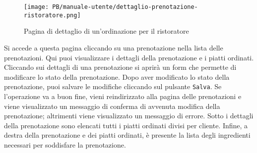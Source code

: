 \begin{figure}[htbp]
    \centering
	\texttt{[image: PB/manuale-utente/dettaglio-prenotazione-ristoratore.png]}
    \caption{Pagina di dettaglio di un'ordinazione per il ristoratore}
\end{figure}

Si accede a questa pagina cliccando su una prenotazione nella lista delle
prenotazioni. Qui puoi visualizzare i dettagli della prenotazione e i piatti
ordinati. Cliccando sui dettagli di una prenotazione si aprirà un form che
permette di modificare lo stato della prenotazione. Dopo aver modificato lo
stato della prenotazione, puoi salvare le modifiche cliccando sul pulsante
\texttt{Salva}. Se l'operazione va a buon fine, vieni reindirizzato alla pagina
delle prenotazioni e viene visualizzato un messaggio di conferma di avvenuta
modifica della prenotazione; altrimenti viene visualizzato un messaggio di errore.
Sotto i dettagli della prenotazione sono elencati tutti i piatti ordinati divisi
per cliente. Infine, a destra della prenotazione e dei piatti ordinati, è
presente la lista degli ingredienti necessari per soddisfare la prenotazione.
